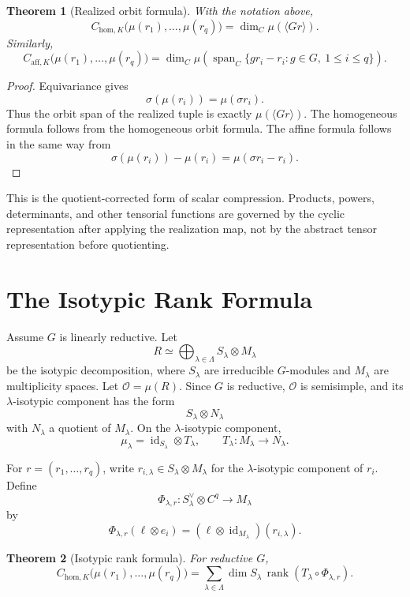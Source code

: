 \documentclass[11pt]{article}
\newtheorem{theorem}{Theorem}[section]
\DeclareMathOperator{\Span}{span}
\DeclareMathOperator{\rank}{rank}
\begin{document}
\begin{theorem}[Realized orbit formula]
With the notation above,
\[
C_{\mathrm{hom},K}\bigl(\mu(r_1),\ldots,\mu(r_q)\bigr)
=
\dim_C\mu(\langle G r\rangle).
\]
Similarly,
\[
C_{\mathrm{aff},K}\bigl(\mu(r_1),\ldots,\mu(r_q)\bigr)
=
\dim_C\mu\left(
\Span_C\{g r_i-r_i:g\in G,\ 1\le i\le q\}
\right).
\]
\end{theorem}

\begin{proof}
Equivariance gives
\[
\sigma(\mu(r_i))=\mu(\sigma r_i).
\]
Thus the orbit span of the realized tuple is exactly \(\mu(\langle G r\rangle)\). The homogeneous formula follows from the homogeneous orbit formula. The affine formula follows in the same way from
\[
\sigma(\mu(r_i))-\mu(r_i)=\mu(\sigma r_i-r_i).
\]
\end{proof}

This is the quotient-corrected form of scalar compression. Products, powers, determinants, and other tensorial functions are governed by the cyclic representation after applying the realization map, not by the abstract tensor representation before quotienting.

\section{The Isotypic Rank Formula}

Assume \(G\) is linearly reductive. Let
\[
R\simeq\bigoplus_{\lambda\in\Lambda}S_\lambda\otimes M_\lambda
\]
be the isotypic decomposition, where \(S_\lambda\) are irreducible \(G\)-modules and \(M_\lambda\) are multiplicity spaces. Let \(\mathcal O=\mu(R)\). Since \(G\) is reductive, \(\mathcal O\) is semisimple, and its \(\lambda\)-isotypic component has the form
\[
S_\lambda\otimes N_\lambda
\]
with \(N_\lambda\) a quotient of \(M_\lambda\). On the \(\lambda\)-isotypic component,
\[
\mu_\lambda=\operatorname{id}_{S_\lambda}\otimes T_\lambda,
\qquad
T_\lambda:M_\lambda\to N_\lambda.
\]

For \(r=(r_1,\ldots,r_q)\), write \(r_{i,\lambda}\in S_\lambda\otimes M_\lambda\) for the \(\lambda\)-isotypic component of \(r_i\). Define
\[
\Phi_{\lambda,r}:S_\lambda^\vee\otimes C^q\to M_\lambda
\]
by
\[
\Phi_{\lambda,r}(\ell\otimes e_i)
=
(\ell\otimes\operatorname{id}_{M_\lambda})(r_{i,\lambda}).
\]

\begin{theorem}[Isotypic rank formula]
For reductive \(G\),
\[
C_{\mathrm{hom},K}\bigl(\mu(r_1),\ldots,\mu(r_q)\bigr)
=
\sum_{\lambda\in\Lambda}
\dim S_\lambda\,
\rank(T_\lambda\circ\Phi_{\lambda,r}).
\]
\end{theorem}
\end{document}
